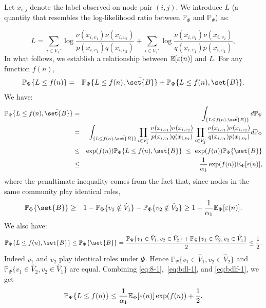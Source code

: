 Let $x_{i,j}$ denote the label observed on node pair $(i,j)$. We introduce $L$ (a quantity that resembles the log-likelihood ratio between $\mathbb{P}_\Phi$ and $\mathbb{P}_{\Psi}$) as: 

\begin{equation}L = \sum_{i \in V_1'}\log \frac{\nu(x_{i,v_1})\nu(x_{i,v_2})}{p(x_{i,v_1})q(x_{i,v_2})} + 
\sum_{i \in V_2'}\log \frac{\nu(x_{i,v_1})\nu(x_{i,v_2})}{q(x_{i,v_1})p(x_{i,v_2})},\end{equation}
In what follows, we establish a relationship between ${\mathbb E} [\varepsilon (n) ]$ and $L$. For any function $f(n)$, 
\begin{eqnarray} \label{eq:8-1}
\mathbb{P}_{\Psi} \{ L \le  f(n) \}& =& \mathbb{P}_{\Psi} \{ L \le  f(n) , \bar{\set{B}} \} + \mathbb{P}_{\Psi} \{ L \le  f(n) , \set{B} \}. 
\end{eqnarray}
We have: 
\begin{eqnarray}\mathbb{P}_{\Psi} \{ L \le  f(n) , \bar{\set{B}}\} &= &
  \int_{\{ L \le  f(n) , \bar{\set{B}}\}} d\mathbb{P}_{\Psi} \cr
&= & \int_{\{ L \le  f(n) , \bar{\set{B}}\}} \prod_{i \in
  V_1'}\frac{\nu(x_{i, v_1})\nu(x_{i,v_2})}{p(x_{i,v_1})q(x_{i,v_2})}
\prod_{i \in V_2'}\frac{\nu(x_{i,v_1})\nu(x_{i,v_2})}{q(x_{i, v_1})p(x_{i,v_2})} d\mathbb{P}_{\Phi} \cr
&\le & \exp (f(n))\mathbb{P}_{\Phi} \{ L \le  f(n) , \bar{\set{B}}\}~ \le ~ \exp (f(n))\mathbb{P}_{\Phi} \{ \bar{\set{B}}\}\cr
&\le &\frac{1}{\alpha_1}\exp (f(n))\Ex_{\Phi} [ \varepsilon (n)],
\label{eq:bdl-1} \end{eqnarray}
where the penultimate inequality comes from the fact that, since nodes in the
same community play identical roles,
\begin{eqnarray*}\mathbb{P}_{\Phi} \{ \set{B} \} &\ge& 1- \mathbb{P}_{\Phi} \{ v_1 \notin
\hat{V}_1 \} - \mathbb{P}_{\Phi} \{ v_2\notin
\hat{V}_2 \} \ge 1-\frac{1}{\alpha_1} \Ex_{\Phi}[ \varepsilon(n) ]. \end{eqnarray*}
We also have: 
\begin{equation}\mathbb{P}_{\Psi} \{ L \le  f(n) , \set{B} \} \le
  \mathbb{P}_{\Psi} \{  \set{B} \} = \frac{ \mathbb{P}_\Psi \{ v_1 \in \hat{V}_1, v_2
\in \hat{V}_2 \} +\mathbb{P}_\Psi \{ v_1 \in \hat{V}_2, v_2
\in \hat{V}_1 \}  }{2} \le
\frac{1}{2}.
\label{eq:bdlf-1}
\end{equation} 
Indeed $v_1$ and $v_2$ play identical roles under $\Psi$. Hence
$\mathbb{P}_\Psi \{v_1 \in \hat{V}_1, v_2 \in \hat{V}_2 \}$ and
$\mathbb{P}_\Psi \{ v_1 \in \hat{V}_2, v_2 \in \hat{V}_1 \}$ are
equal.
Combining \eqref{eq:8-1},~\eqref{eq:bdl-1}, and \eqref{eq:bdlf-1}, we get
$$\mathbb{P}_{\Psi} \{ L \le  f(n) \} \le \frac{1}{\alpha_1}{\mathbb E}_{\Phi}[\varepsilon(n) ]\exp(f(n)) +
\frac{1}{2}. $$

